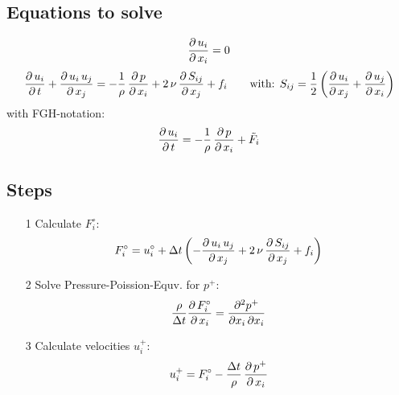 \documentclass[11pt,a4paper]{article}
\begin{document}
\subsection{Equations to solve}
\begin{align}
\frac{\partial \, u_i}{\partial \, x_i}=0
\end{align}
\begin{align}
\frac{\partial \, u_i	}{\partial \, t}+\frac{\partial \, u_i\,u_j}{\partial \, x_j}=-\frac{1}{\rho}\,\frac{\partial \, p}{\partial \, x_i}+2\,\nu\,\frac{\partial \, S_{ij}}{\partial \, x_j}+f_i \qquad
\text{with: }S_{ij}=\frac{1}{2}\left(\frac{\partial \, u_i}{\partial \, x_j}+\frac{\partial \, u_j}{\partial \, x_i}\right)
\end{align}
with FGH-notation:
\begin{align}
\frac{\partial \, u_i	}{\partial \, t}=-\frac{1}{\rho}\,\frac{\partial \, p}{\partial \, x_i}+\tilde F_i
\end{align}


\subsection{Steps}
\begin{itemize}
\item[1] Calculate $F_i^\circ$:
\begin{align*}
F_i^\circ=u_i^\circ+\Delta t\left(-\frac{\partial \, u_i\,u_j}{\partial \, x_j} +2\,\nu\,\frac{\partial \, S_{ij}}{\partial \, x_j}+f_i  \right)
\end{align*}
\item[2] Solve Pressure-Poission-Equv. for $p^+$:
\begin{align*}
\frac{\rho}{\Delta t} \frac{\partial \, F_i^\circ}{\partial \, x_i}  =
\frac{\partial^2 p^+}{\partial x_i\,\partial x_i}
\end{align*}
\item[3] Calculate velocities $u_i^+$:
\begin{align*}
u_i^+
=F_i^\circ-\frac{\Delta t}{\rho}\,\frac{\partial \, p^+}{\partial \, x_i}
\end{align*}
\end{itemize}
\end{document}
